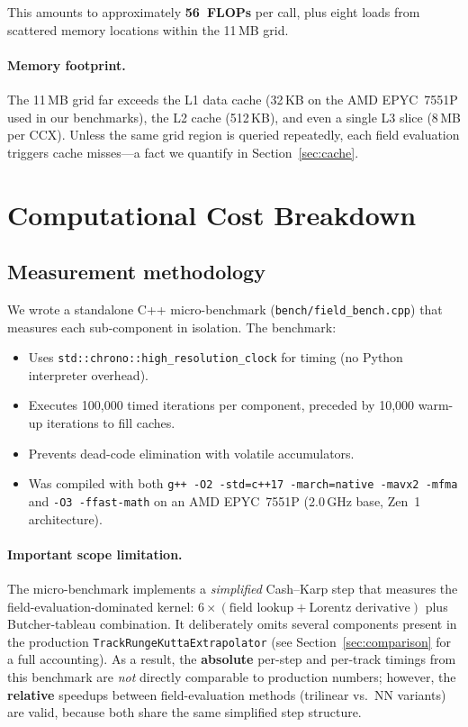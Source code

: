 \documentclass[11pt,a4paper]{article}
\begin{document}
This amounts to approximately \textbf{56~FLOPs} per call, plus
eight loads from scattered memory locations within the 11\,MB grid.

\paragraph{Memory footprint.}
The 11\,MB grid far exceeds the L1 data cache (32\,KB on the AMD
EPYC~7551P used in our benchmarks), the L2 cache (512\,KB), and even
a single L3 slice (8\,MB per CCX).  Unless the same grid region is
queried repeatedly, each field evaluation triggers cache misses---a
fact we quantify in Section~\ref{sec:cache}.


\section{Computational Cost Breakdown}
\label{sec:cost}

\subsection{Measurement methodology}

We wrote a standalone C++ micro-benchmark
(\texttt{bench/field\_bench.cpp}) that measures each sub-component in
isolation.  The benchmark:

\begin{itemize}
    \item Uses \texttt{std::chrono::high\_resolution\_clock} for timing
          (no Python interpreter overhead).
    \item Executes 100{,}000 timed iterations per component, preceded
          by 10{,}000 warm-up iterations to fill caches.
    \item Prevents dead-code elimination with volatile accumulators.
    \item Was compiled with both \texttt{g++ -O2 -std=c++17
          -march=native -mavx2 -mfma} and \texttt{-O3 -ffast-math}
          on an AMD EPYC~7551P (2.0\,GHz base, Zen~1 architecture).
\end{itemize}

\paragraph{Important scope limitation.}
The micro-benchmark implements a \emph{simplified} Cash--Karp step
that measures the field-evaluation-dominated kernel:
$6 \times (\text{field lookup} + \text{Lorentz derivative})$
plus Butcher-tableau combination.  It deliberately omits several
components present in the production \texttt{TrackRungeKuttaExtrapolator}
(see Section~\ref{sec:comparison} for a full accounting).  As a
result, the \textbf{absolute} per-step and per-track timings from this
benchmark are \emph{not} directly comparable to production numbers;
however, the \textbf{relative} speedups between field-evaluation
methods (trilinear vs.\ NN variants) are valid, because both share
the same simplified step structure.
\end{document}
